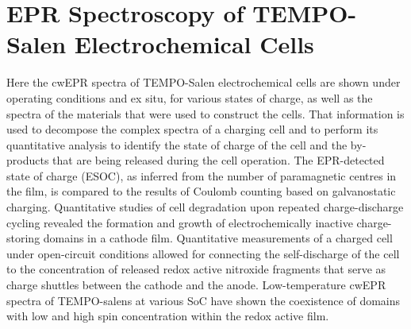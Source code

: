 \chapter{EPR Spectroscopy of TEMPO-Salen Electrochemical Cells}
\label{ch:SPINS_AT_WORK}
Here the cwEPR spectra of TEMPO-Salen electrochemical cells are shown under operating conditions and ex situ, for various states of charge, as well as the spectra of the materials that were used to construct the cells.
That information is used to decompose the complex spectra of a charging cell and to perform its quantitative analysis to identify the state of charge of the cell and the by-products that are being released during the cell operation. The EPR-detected state of charge (ESOC), as inferred from the number of paramagnetic centres in the film, is compared to the results of Coulomb counting based on galvanostatic charging. Quantitative studies of cell degradation upon repeated charge-discharge cycling revealed the formation and growth of electrochemically inactive charge-storing domains in a cathode film. Quantitative measurements of a charged cell under open-circuit conditions allowed for connecting the self-discharge of the cell to the concentration of released redox active nitroxide fragments that serve as charge shuttles between the cathode and the anode. Low-temperature cwEPR spectra of TEMPO-salens at various SoC have shown the coexistence of domains with low and high spin concentration within the redox active film.


